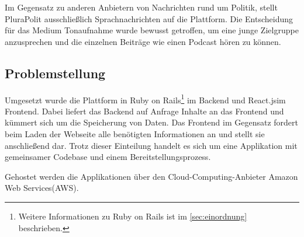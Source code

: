 Im Gegensatz zu anderen Anbietern von Nachrichten rund um Politik, stellt PluraPolit ausschließlich Sprachnachrichten auf die Plattform. Die Entscheidung für das Medium Tonaufnahme wurde bewusst getroffen, um eine junge Zielgruppe anzusprechen und die einzelnen Beiträge wie einen Podcast hören zu können.

\subsection{Problemstellung}

Umgesetzt wurde die Plattform in Ruby on Rails\footnote{Weitere Informationen zu Ruby on Rails ist im \cref{sec:einordnung} beschrieben.} im Backend und React.js\footnotemark im Frontend. Dabei liefert das Backend auf Anfrage Inhalte an das Frontend und kümmert sich um die Speicherung von Daten. Das Frontend im Gegensatz fordert beim Laden der Webseite alle benötigten Informationen an und stellt sie anschließend dar. Trotz dieser Einteilung handelt es sich um eine Applikation mit gemeinsamer Codebase und einem Bereitstellungsprozess.


Gehostet werden die Applikationen über den Cloud-Computing-Anbieter Amazon Web Services\footnotemark (AWS).

